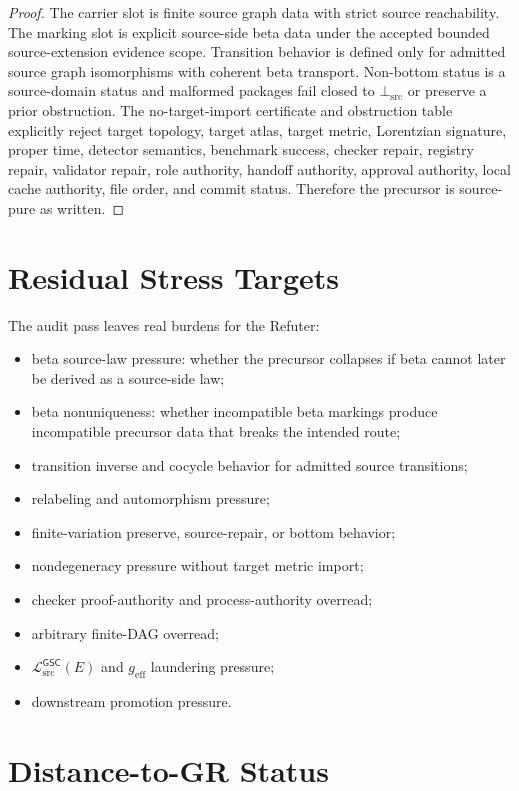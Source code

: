 \documentclass[11pt]{article}
\newcommand{\MetricData}{\mathcal{L}_{\mathrm{src}}^{\mathsf{GSC}}}
\newcommand{\BottomSrc}{\bot_{\mathrm{src}}}
\newcommand{\geff}{g_{\mathrm{eff}}}
\begin{document}
\begin{proof}
The carrier slot is finite source graph data with strict source reachability.
The marking slot is explicit source-side beta data under the accepted bounded
source-extension evidence scope. Transition behavior is defined only for
admitted source graph isomorphisms with coherent beta transport. Non-bottom
status is a source-domain status and malformed packages fail closed to
\(\BottomSrc\) or preserve a prior obstruction. The no-target-import
certificate and obstruction table explicitly reject target topology, target
atlas, target metric, Lorentzian signature, proper time, detector semantics,
benchmark success, checker repair, registry repair, validator repair, role
authority, handoff authority, approval authority, local cache authority, file
order, and commit status. Therefore the precursor is source-pure as written.
\end{proof}

\section{Residual Stress Targets}

The audit pass leaves real burdens for the Refuter:
\begin{itemize}[leftmargin=*]
  \item beta source-law pressure: whether the precursor collapses if beta
  cannot later be derived as a source-side law;
  \item beta nonuniqueness: whether incompatible beta markings produce
  incompatible precursor data that breaks the intended route;
  \item transition inverse and cocycle behavior for admitted source
  transitions;
  \item relabeling and automorphism pressure;
  \item finite-variation preserve, source-repair, or bottom behavior;
  \item nondegeneracy pressure without target metric import;
  \item checker proof-authority and process-authority overread;
  \item arbitrary finite-DAG overread;
  \item \(\MetricData(E)\) and \(\geff\) laundering pressure;
  \item downstream promotion pressure.
\end{itemize}

\section{Distance-to-GR Status}
\end{document}
